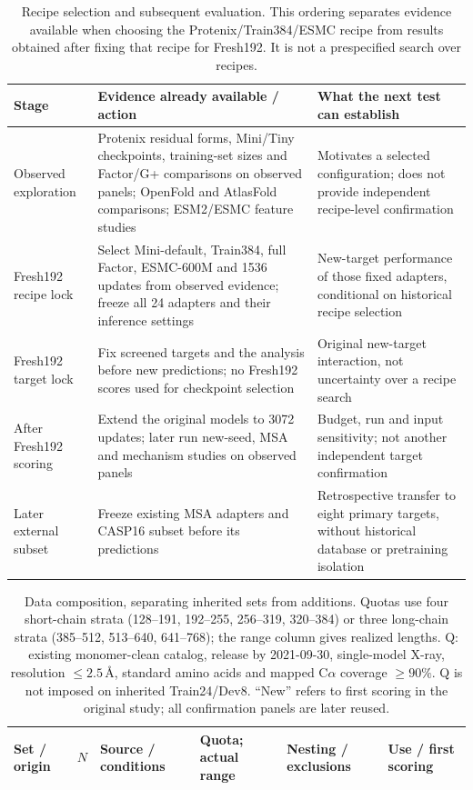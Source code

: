 \begin{table}[htbp]\centering\small
\caption{Recipe selection and subsequent evaluation. This ordering separates
evidence available when choosing the Protenix/Train384/ESMC recipe from
results obtained after fixing that recipe for Fresh192. It is not a
prespecified search over recipes.}
\label{tab:recipe_selection}
\begin{tabular}{@{}p{.17\linewidth}p{.44\linewidth}p{.33\linewidth}@{}}\toprule
Stage & Evidence already available / action & What the next test can establish \\\midrule
Observed exploration & Protenix residual forms, Mini/Tiny checkpoints,
training-set sizes and Factor/G+ comparisons on observed panels; OpenFold
and AtlasFold comparisons; ESM2/ESMC feature studies & Motivates a selected
configuration; does not provide independent recipe-level confirmation \\[3pt]
Fresh192 recipe lock & Select Mini-default, Train384, full Factor,
ESMC-600M and 1536 updates from observed evidence; freeze all 24 adapters
and their inference settings & New-target performance of those fixed
adapters, conditional on historical recipe selection \\[3pt]
Fresh192 target lock & Fix screened targets and the analysis before
new predictions; no Fresh192 scores used for checkpoint selection &
Original new-target interaction, not uncertainty over a recipe search \\[3pt]
After Fresh192 scoring & Extend the original models to 3072 updates;
later run new-seed, MSA and mechanism studies on observed panels &
Budget, run and input sensitivity; not another independent target confirmation \\[3pt]
Later external subset & Freeze existing MSA adapters and CASP16 subset
before its predictions & Retrospective transfer to eight primary targets,
without historical database or pretraining isolation \\\bottomrule
\end{tabular}\end{table}

\begin{table}[htbp]
\caption{Data composition, separating inherited sets from additions. Quotas
use four short-chain strata (128--191, 192--255, 256--319, 320--384) or three
long-chain strata (385--512, 513--640, 641--768); the range column gives realized
lengths. Q: existing monomer-clean catalog, release by 2021-09-30, single-model
X-ray, resolution $\le2.5$\,\AA, standard amino acids and mapped C$\alpha$
coverage $\ge90\%$. Q is not imposed on inherited Train24/Dev8. ``New'' refers
to first scoring in the original study; all confirmation panels are later reused.}
\label{tab:data_composition}\centering\scriptsize\setlength{\tabcolsep}{3pt}
\begin{tabular}{p{.13\linewidth}rp{.16\linewidth}p{.14\linewidth}p{.23\linewidth}p{.19\linewidth}}\toprule
Set / origin & $N$ & Source / conditions & Quota; actual range & Nesting / exclusions & Use / first scoring \\\midrule

\end{tabular}
\end{table}

